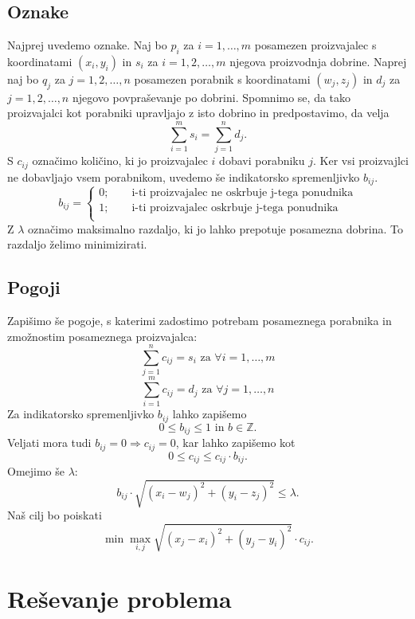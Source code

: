 \documentclass[a4paper, 11pt]{article}
\newcommand{\Z}{\mathbb Z}
\begin{document}
\subsection{Oznake}
Najprej uvedemo oznake. Naj bo $p_i$ za $i=1,\dots,m$ posamezen proizvajalec s koordinatami $(x_i,y_i)$ in 
$s_i$ za $i=1,2,\dots,m$ njegova proizvodnja dobrine. 
Naprej naj bo $q_j$ za $j=1,2,\dots,n$ posamezen porabnik s koordinatami $(w_j,z_j)$ in $d_j$ 
za $j=1,2,\dots,n$ njegovo povpraševanje 
po dobrini. Spomnimo se, da tako proizvajalci kot porabniki upravljajo z isto dobrino in predpostavimo, da velja
$$
\sum_{i=1}^m s_i = \sum_{j=1}^n d_j.
$$ 
S $c_{ij}$ označimo količino, ki jo proizvajalec $i$ dobavi porabniku $j$. Ker vsi proizvajlci ne 
dobavljajo vsem porabnikom, uvedemo še indikatorsko spremenljivko $b_{ij}$.
$$
b_{ij} = 
\begin{cases}
    0;\qquad \textrm{i-ti proizvajalec ne oskrbuje j-tega ponudnika} \\
    1;\qquad \textrm{i-ti proizvajalec oskrbuje j-tega ponudnika} \\
\end{cases} 
$$
Z $\lambda$ označimo maksimalno razdaljo, ki jo lahko prepotuje posamezna dobrina. To razdaljo 
želimo minimizirati.
\subsection{Pogoji}
Zapišimo še pogoje, s katerimi zadostimo potrebam posameznega porabnika in zmožnostim posameznega 
proizvajalca:
$$
\sum_{j=1}^n c_{ij} = s_i \text{ za } \forall i = 1,\dots,m 
$$
$$
\sum_{i=1}^m c_{ij} = d_j \text{ za } \forall j = 1,\dots,n 
$$
Za indikatorsko spremenljivko $b_{ij}$ lahko zapišemo $$0 \leq b_{ij} \leq 1 \text{ in } b \in \Z.$$
Veljati mora tudi $b_{ij}=0 \Rightarrow c_{ij}=0$, kar lahko zapišemo kot 
$$0 \leq c_{ij} \leq c_{ij}\cdot b_{ij}.$$
Omejimo še $\lambda$:
$$b_{ij}\cdot \sqrt{(x_i - w_j)^2+(y_i - z_j)^2} \leq \lambda.$$
\noindent
Naš cilj bo poiskati
$$
\min \max_{i,j} \sqrt{(x_j-x_i)^2 + (y_j-y_i)^2} \cdot c_{ij}.
$$

\section{Reševanje problema}
\end{document}
